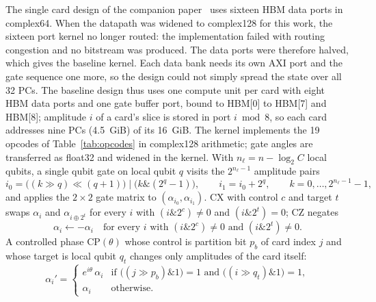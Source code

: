 \documentclass[pdflatex,sn-mathphys-num]{sn-jnl}
\newcommand{\band}{\mathbin{\&}}
\newcommand{\bor}{\mathbin{|}}
\newcommand{\shr}{\mathbin{\gg}}
\newcommand{\shl}{\mathbin{\ll}}
\theoremstyle{thmstyleone}
\theoremstyle{thmstylethree}
\begin{document}
The single card design of the companion paper~\cite{tiwari2026fpga30} uses sixteen HBM data ports in complex64. When the
datapath was widened to complex128 for this work, the sixteen port kernel no longer routed: the implementation failed
with routing congestion and no bitstream was produced. The data ports were therefore halved, which gives the baseline
kernel. Each data bank needs its own AXI port and the gate sequence one more, so the design could not simply
spread the state over all 32 PCs. The baseline design thus uses one compute unit per card with eight HBM data ports and one gate buffer port,
bound to HBM[0] to HBM[7] and HBM[8]; amplitude $i$ of a card's slice is stored in port $i \bmod 8$, so each card
addresses nine PCs (4.5~GiB) of its 16~GiB. The kernel implements the 19 opcodes of Table~\ref{tab:opcodes} in
complex128 arithmetic; gate angles are transferred as float32 and widened in the kernel. With $n_\ell = n - \log_2 C$
local qubits, a single qubit gate on local qubit $q$ visits the $2^{n_\ell-1}$ amplitude pairs
\begin{equation}
i_0 = \bigl((k \shr q) \shl (q+1)\bigr) \bor \bigl(k \band (2^q-1)\bigr), \qquad i_1 = i_0 + 2^q,
\qquad k = 0,\dots,2^{n_\ell-1}-1, \label{eq:pair}
\end{equation}
and applies the $2\times2$ gate matrix to $(\alpha_{i_0}, \alpha_{i_1})$. CX with control $c$ and target $t$ swaps
$\alpha_i$ and $\alpha_{i \oplus 2^t}$ for every $i$ with $(i \band 2^c) \ne 0$ and $(i \band 2^t) = 0$; CZ negates
\begin{equation}
\alpha_i \leftarrow -\alpha_i \quad \text{for every } i \text{ with } (i \band 2^c) \ne 0 \text{ and } (i \band 2^t) \ne 0.
\label{eq:cz}
\end{equation}
A controlled phase $\mathrm{CP}(\theta)$ whose control is partition bit $p_b$ of card index $j$ and whose target is
local qubit $q_t$ changes only amplitudes of the card itself:
\begin{equation}
\alpha_i' = \begin{cases} e^{i\theta}\,\alpha_i & \text{if } \bigl((j \shr p_b) \band 1\bigr) = 1 \text{ and }
\bigl((i \shr q_t) \band 1\bigr) = 1,\\ \alpha_i & \text{otherwise.}\end{cases} \label{eq:diag}
\end{equation}
\end{document}
